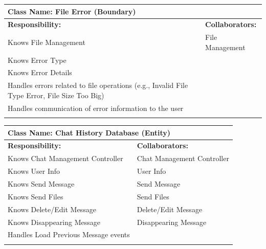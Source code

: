 \documentclass[]{article}
\begin{document}
\begin{itemize}
	\begin{table}[ht]
		\centering
		\begin{tabular}{|p{7cm}|p{7cm}|}
		\hline 
		 \multicolumn{2}{|l|}{\textbf{Class Name:} File Error (Boundary)} \\
		\hline
		\textbf{Responsibility:} & \textbf{Collaborators:} \\
		\hline
			Knows File Management & File Management \\
			Knows Error Type &\\
			Knows Error Details &\\
			Handles errors related to file operations (e.g., Invalid File Type Error, File Size Too Big) &\\
			Handles communication of error information to the user &\\
		\vspace{0.1in} & \\
		\hline
		\end{tabular}
	\end{table}

	\begin{table}[ht]
		\centering
		\begin{tabular}{|p{7cm}|p{7cm}|}
		\hline 
		\multicolumn{2}{|l|}{\textbf{Class Name:} Chat History Database (Entity)} \\
		\hline
		\textbf{Responsibility:} & \textbf{Collaborators:} \\
		\hline
  			Knows Chat Management Controller & Chat Management Controller \\
     			Knows User Info & User Info \\
			Knows Send Message & Send Message \\
			Knows Send Files & Send Files \\
			Knows Delete/Edit Message & Delete/Edit Message\\
			Knows Disappearing Message & Disappearing Message \\
			Handles Load Previous Message events & \\
		\vspace{1in} & \\
		\hline
		\end{tabular}
	\end{table}


\end{itemize}
\end{document}
